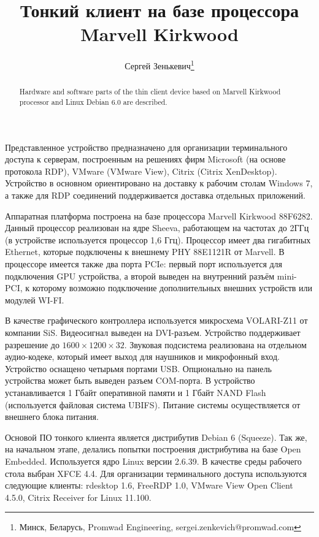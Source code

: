 \documentclass[10pt, a5paper]{article}
\begin{document}
\title{Тонкий клиент на базе процессора Marvell Kirkwood}%

\author{Сергей Зенькевич\footnote{Минск, Беларусь, Promwad Engineering, sergei.zenkevich@promwad.com}}
\maketitle

\begin{abstract}
Hardware and software parts of the thin client device based on Marvell Kirkwood processor and Linux Debian 6.0 are described.
\end{abstract}


Представленное устройство предназначено для организации терминального доступа к серверам, построенным на решениях фирм Microsoft (на основе протокола RDP), VMware (VMware View), Citrix (Citrix XenDesktop). Устройство в основном ориентировано на доставку к рабочим столам Windows 7, а также для RDP соединений поддерживается доставка отдельных приложений.

Аппаратная платформа построена на базе процессора Marvell Kirkwood 88F6282. Данный процессор реализован на ядре Sheeva, работающем на частотах до 2ГГц (в устройстве используется процессор 1,6 Ггц). Процессор имеет два гигабитных Ethernet, которые подключены к внешнему PHY 88E1121R от Marvell. В процессоре имеется также два порта PCIe: первый порт используется для подключения GPU устройства, а второй выведен на внутренний разъём mini-PCI, к которому возможно подключение дополнительных внешних устройств или модулей WI-FI.

В качестве графического контроллера используется микросхема VOLARI-Z11 от компании SiS. Видеосигнал выведен на DVI-разъем. Устройство поддерживает разрешение до $1600\times1200\times32$. Звуковая подсистема реализована на отдельном аудио-кодеке, который имеет выход для наушников и микрофонный вход. Устройство оснащено четырьмя портами USB. Опционально на панель устройства может быть выведен разъем COM-порта. В устройство устанавливается 1 Гбайт оперативной памяти и 1 Гбайт NAND Flash (используется файловая система UBIFS). Питание системы осуществляется от внешнего блока питания.

Основой ПО тонкого клиента является дистрибутив Debian 6 (Squeeze). Так же, на начальном этапе, делались попытки построения дистрибутива на базе Open Embedded. Используется ядро Linux версии 2.6.39. В качестве среды рабочего стола выбран XFCE 4.4. Для организации терминального доступа используются следующие клиенты: rdesktop 1.6, FreeRDP 1.0, VMware View Open Client 4.5.0, Citrix Receiver for Linux 11.100.
\end{document}
